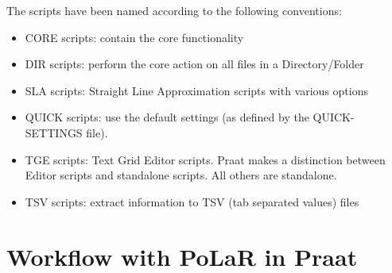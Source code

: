 The scripts have been named according to the following conventions:

\begin{itemize}
	\item CORE scripts: contain the core functionality 
	\item DIR scripts: perform the core action on all files in a Directory\slash Folder
	\item SLA scripts: Straight Line Approximation scripts with various options
	\item QUICK scripts: use the default settings (as defined by the QUICK-SETTINGS file).
	\item TGE scripts: Text Grid Editor scripts. Praat makes a distinction between Editor scripts and standalone scripts. All others are standalone. 
	\item TSV scripts: extract information to TSV (tab separated values) files
\end{itemize}


\section{Workflow with PoLaR in Praat}\label{sec:workflow-with-polar-in-praat}

